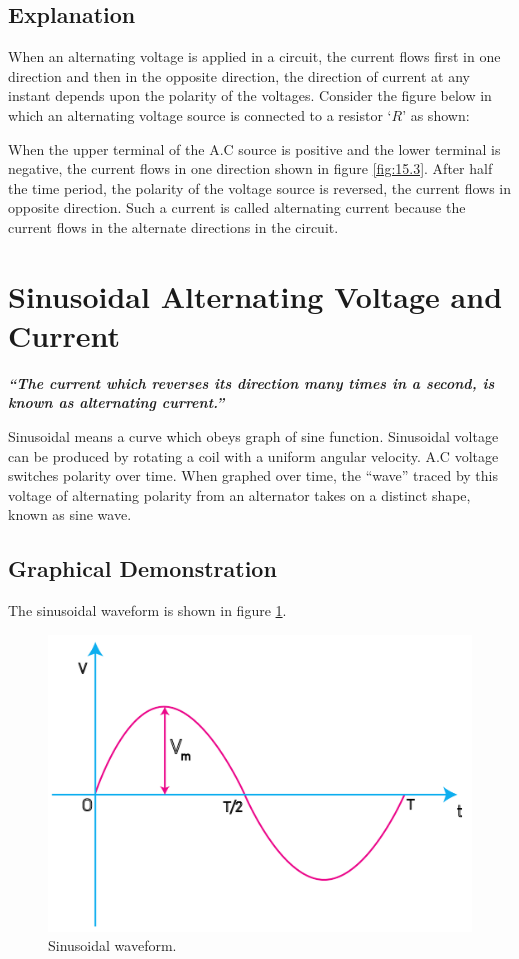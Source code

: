 \subsection*{Explanation}    
When an alternating voltage is applied in a circuit, the current flows
first in one direction and then in the opposite direction, the direction of current at any instant depends upon the polarity of the voltages.
Consider the figure below in which an alternating voltage source is
connected to a resistor ‘$R$’ as shown:

When the upper terminal of the A.C source is positive and the
lower terminal is negative, the current flows in one direction
shown in figure \ref{fig:15.3}. After half the time period, the polarity of the
voltage source is reversed, the current flows in opposite direction.
Such a current is called alternating current because the current flows
in the alternate directions in the circuit. 
\section{Sinusoidal Alternating Voltage and Current}
\textit{\textbf{“The current which reverses its direction many times 
in a second, is known as alternating current.”}}
 
Sinusoidal means a curve which obeys graph of sine function.
Sinusoidal voltage can be produced by rotating a coil with a
uniform angular velocity. A.C voltage switches polarity over time.
When graphed over time, the “wave” traced by this voltage of alternating
polarity from an alternator takes on a distinct shape, known as sine wave. 

\subsection*{Graphical Demonstration}
The sinusoidal waveform is shown in figure \ref{fig:15.4}.
\begin{figure}[H]
    \centering
    \includegraphics[scale = 0.6]{Images/Chapter-15/15.4}
    \caption{Sinusoidal waveform.}
    \label{fig:15.4}
\end{figure}

